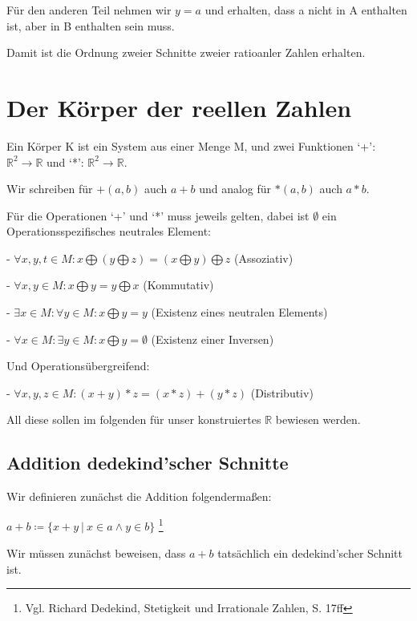 \documentclass[12pt]{article}
\begin{document}
    Für den anderen Teil nehmen wir $y = a$ und erhalten, dass a nicht in A enthalten ist, aber in B enthalten sein
    muss.

    Damit ist die Ordnung zweier Schnitte zweier ratioanler Zahlen erhalten.

    \newpage

    \section{Der Körper der reellen Zahlen}

    Ein Körper K ist ein System aus einer Menge M, und zwei Funktionen `+': $\mathbb{R}^2 \rightarrow \mathbb{R}$
    und `*': $\mathbb{R}^2 \rightarrow \mathbb{R}$.

    Wir schreiben für $+(a, b)$ auch $a + b$ und analog für $*(a, b)$ auch $a * b$.

    Für die Operationen `+' und `*' muss jeweils gelten, dabei ist $\emptyset$ ein Operationsspezifisches
    neutrales Element:

    - $\forall x, y, t \in M: x \bigoplus (y \bigoplus z) = (x \bigoplus y) \bigoplus z$  (Assoziativ)

    - $\forall x, y \in M: x \bigoplus y = y \bigoplus x$  (Kommutativ)

    - $\exists x \in M: \forall y \in M: x \bigoplus y = y$  (Existenz eines neutralen Elements)

    - $\forall x \in M: \exists y \in M: x \bigoplus y = \emptyset$  (Existenz einer Inversen)

    Und Operationsübergreifend:

    - $\forall x, y, z \in M: (x + y) * z = (x * z) + (y * z)$ (Distributiv)

    All diese sollen im folgenden für unser konstruiertes $\mathbb{R}$ bewiesen werden.

    \subsection{Addition dedekind'scher Schnitte}

    Wir definieren zunächst die Addition folgendermaßen:

    $a + b \coloneqq \{x + y \mspace{4mu} | \mspace{4mu} x \in a \land y \in b\}$
    \footnote{
        Vgl. Richard Dedekind, Stetigkeit und Irrationale Zahlen, S. 17ff
    }

    Wir müssen zunächst beweisen, dass $a + b$ tatsächlich ein dedekind'scher Schnitt ist.
\end{document}
